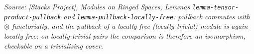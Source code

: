 \begin{lemma}
  \textit{Source: [Stacks Project], Modules on Ringed Spaces, Lemmas
  \texttt{lemma-tensor-product-pullback} and \texttt{lemma-pullback-locally-free}:
  pullback commutes with \(\otimes\) functorially, and the pullback of a locally free
  (locally trivial) module is again locally free; on locally-trivial pairs the comparison
  is therefore an isomorphism, checkable on a trivialising cover.}
\end{lemma}

